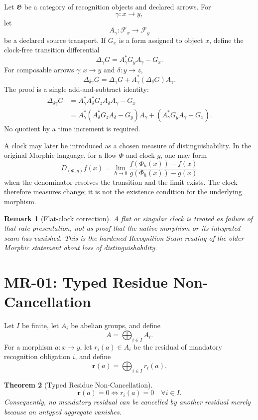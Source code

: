 \documentclass[11pt]{article}
\newtheorem{theorem}{Theorem}[section]
\newtheorem{remark}[theorem]{Remark}
\begin{document}
Let \(\mathfrak G\) be a category of recognition objects and declared arrows. For
\[
\gamma:x\to y,
\]
let
\[
A_\gamma:\mathcal F_x\to\mathcal F_y
\]
be a declared source transport. If \(G_x\) is a form assigned to object \(x\), define the clock-free transition differential
\[
\boxed{
\Delta_\gamma G
=A_\gamma^*G_yA_\gamma-G_x.
}
\]
For composable arrows \(\gamma:x\to y\) and \(\delta:y\to z\),
\[
\boxed{
\Delta_{\delta\gamma}G
=
\Delta_\gamma G
+A_\gamma^*(\Delta_\delta G)A_\gamma.
}
\]
The proof is a single add-and-subtract identity:
\begin{align*}
\Delta_{\delta\gamma}G
&=A_\gamma^*A_\delta^*G_zA_\delta A_\gamma-G_x\\
&=A_\gamma^*(A_\delta^*G_zA_\delta-G_y)A_\gamma
 +(A_\gamma^*G_yA_\gamma-G_x).
\end{align*}
No quotient by a time increment is required.

A clock may later be introduced as a chosen measure of distinguishability. In the original Morphic language, for a flow \(\Phi\) and clock \(g\), one may form
\[
D_{(\Phi,g)}f(x)
=
\lim_{h\to0}
\frac{f(\Phi_h(x))-f(x)}{g(\Phi_h(x))-g(x)}
\]
when the denominator resolves the transition and the limit exists. The clock therefore measures change; it is not the existence condition for the underlying morphism.

\begin{remark}[Flat-clock correction]
A flat or singular clock is treated as failure of that rate presentation, not as proof that the native morphism or its integrated seam has vanished. This is the hardened Recognition-Seam reading of the older Morphic statement about loss of distinguishability.
\end{remark}

\section{MR-01: Typed Residue Non-Cancellation}

Let \(I\) be finite, let \(A_i\) be abelian groups, and define
\[
A=\bigoplus_{i\in I}A_i.
\]
For a morphism \(a:x\to y\), let \(r_i(a)\in A_i\) be the residual of mandatory recognition obligation \(i\), and define
\[
\mathbf r(a)=\bigoplus_{i\in I}r_i(a).
\]

\begin{theorem}[Typed Residue Non-Cancellation]
\[
\boxed{
\mathbf r(a)=0
\iff
r_i(a)=0\quad\forall i\in I.
}
\]
Consequently, no mandatory residual can be cancelled by another residual merely because an untyped aggregate vanishes.
\end{theorem}
\end{document}
